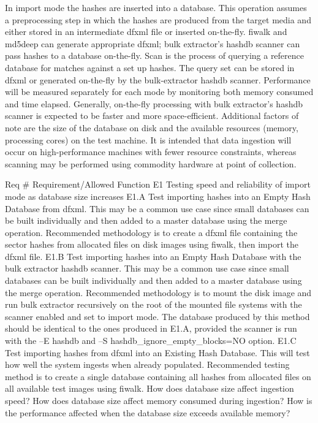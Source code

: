 \documentclass[12pt,twoside]{article}
\begin{document}
In import mode the hashes are inserted into a database. This operation assumes a preprocessing step in which the hashes are produced from the target media and either stored in an intermediate dfxml file or inserted on-the-fly. fiwalk and md5deep can generate appropriate dfxml; bulk extractor’s hashdb scanner can pass hashes to a database on-the-fly.
Scan is the process of querying a reference database for matches against a set up hashes. The query set can be stored in dfxml or generated on-the-fly by the bulk-extractor hashdb scanner.
Performance will be measured separately for each mode by monitoring both memory consumed and time elapsed. Generally, on-the-fly processing with bulk extractor’s hashdb scanner is expected to be faster and more space-efficient. 
Additional factors of note are the size of the database on disk and the available resources (memory, processing cores) on the test machine. 
It is intended that data ingestion will occur on high-performance machines with fewer resource constraints, whereas scanning may be performed using commodity hardware at point of collection.

Req #
Requirement/Allowed Function
E1
Testing speed and reliability of import mode as database size increases
E1.A
Test importing hashes into an Empty Hash Database from dfxml.  This may be a common use case since small databases can be built individually and then added to a master database using the merge operation.  Recommended methodology is to create a dfxml file containing the sector hashes from allocated files on disk images using fiwalk, then import the dfxml file.
E1.B
Test importing hashes into an Empty Hash Database with the bulk extractor hashdb scanner.  This may be a common use case since small databases can be built individually and then added to a master database using the merge operation.  Recommended methodology is to mount the disk image and run bulk extractor recursively on the root of the mounted file systems with the scanner enabled and set to import mode. The database produced by this method should be identical to the ones produced in E1.A, provided the scanner is run with the –E hashdb and –S hashdb_ignore_empty_blocks=NO option.
E1.C
Test importing hashes from dfxml into an Existing Hash Database.  This will test how well the system ingests when already populated. Recommended testing method is to create a single database containing all hashes from allocated files on all available test images using fiwalk.
How does database size affect ingestion speed?
How does database size affect memory consumed during ingestion?
How is the performance affected when the database size exceeds available memory?
\end{document}
